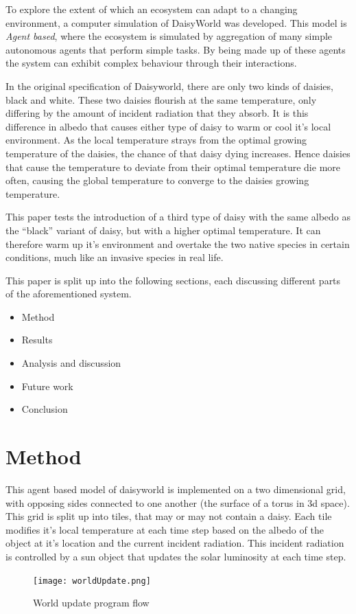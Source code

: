 \documentclass[12pt]{article}
\begin{document}
To explore the extent of which an ecosystem can adapt to a changing
environment, a computer simulation of DaisyWorld\cite{watson1983} was
developed. This model is \emph{Agent based}\cite{gilbert2007}, where
the ecosystem is simulated by aggregation of many simple autonomous
agents that perform simple tasks. By being made up of these agents the
system can exhibit complex behaviour through their interactions.

In the original specification of Daisyworld, there are only
two kinds of daisies, black and white. These two daisies flourish at
the same temperature, only differing by the amount of incident
radiation that they absorb. It is this difference in albedo that
causes either type of daisy to warm or cool it's local environment. As
the local temperature strays from the optimal growing temperature of the
daisies, the chance of that daisy dying increases. Hence daisies that
cause the temperature to deviate from their optimal temperature die more
often, causing the global temperature to converge to the daisies
growing temperature.

This paper tests the introduction of a third type of daisy with the
same albedo as the ``black'' variant of daisy, but with a higher
optimal temperature. It can therefore warm up it's environment and
overtake the two native species in certain conditions, much like an
invasive species in real life.

This paper is split up into the following sections, each discussing
different parts of the aforementioned system.

\begin{itemize}
\item Method
\item Results
\item Analysis and discussion
\item Future work
\item Conclusion
\end{itemize}

\section{Method}
This agent based model of daisyworld is implemented on a two
dimensional grid, with opposing sides connected to one another (the
surface of a torus in 3d space). This grid is split up into tiles,
that may or may not contain a daisy. Each tile modifies it's local
temperature at each time step based on the albedo of the object at
it's location and the current incident radiation. This incident
radiation is controlled by a sun object that updates the solar
luminosity at each time step.
\begin{figure}[h!]
  \centering
  \texttt{[image: worldUpdate.png]}
  \caption{World update program flow}
  \label{fig:worldUpdate}
\end{figure}
\end{document}
